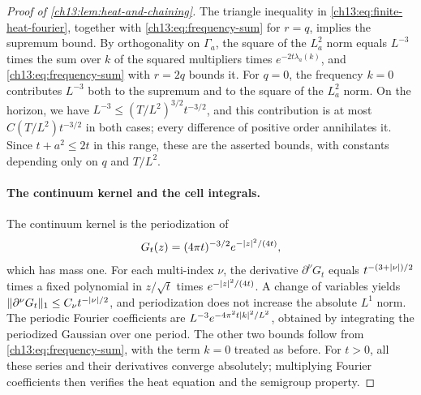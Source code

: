 \begin{proof}[Proof of \cref{ch13:lem:heat-and-chaining}]
The triangle inequality in \eqref{ch13:eq:finite-heat-fourier}, together with \eqref{ch13:eq:frequency-sum} for $r=q$, implies the supremum bound. By orthogonality on $\Gamma_a$, the square of the $L^2_a$ norm equals $L^{-3}$ times the sum over $k$ of the squared multipliers times $e^{-2t\lambda_a(k)}$, and \eqref{ch13:eq:frequency-sum} with $r=2q$ bounds it. For $q=0$, the frequency $k=0$ contributes $L^{-3}$ both to the supremum and to the square of the $L^2_a$ norm. On the horizon, we have $L^{-3}\le(T/L^2)^{3/2}t^{-3/2}$, and this contribution is at most $C(T/L^2)t^{-3/2}$ in both cases; every difference of positive order annihilates it. Since $t+a^2\le2t$ in this range, these are the asserted bounds, with constants depending only on $q$ and $T/L^2$.

\paragraph{The continuum kernel and the cell integrals.}
The continuum kernel is the periodization of
\[
 G_t(z)=(4\pi t)^{-3/2}e^{-\lvert z\rvert^2/(4t)},
\]
which has mass one. For each multi-index $\nu$, the derivative $\partial^\nu G_t$ equals $t^{-(3+\lvert \nu\rvert)/2}$ times a fixed polynomial in $z/\sqrt t$ times $e^{-\lvert z\rvert^2/(4t)}$. A change of variables yields $\lVert \partial^\nu G_t\rVert_1\le C_\nu t^{-\lvert \nu\rvert/2}$, and periodization does not increase the absolute $L^1$ norm. The periodic Fourier coefficients are $L^{-3}e^{-4\pi^2t\lvert k\rvert^2/L^2}$, obtained by integrating the periodized Gaussian over one period. The other two bounds follow from \eqref{ch13:eq:frequency-sum}, with the term $k=0$ treated as before. For $t>0$, all these series and their derivatives converge absolutely; multiplying Fourier coefficients then verifies the heat equation and the semigroup property.


\end{proof}
